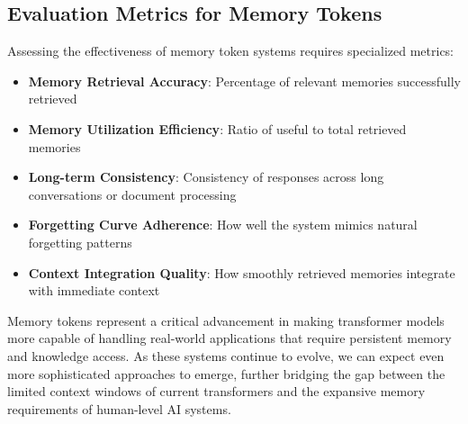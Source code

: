 \subsection{Evaluation Metrics for Memory Tokens}

Assessing the effectiveness of memory token systems requires specialized metrics:

\begin{itemize}
\item \textbf{Memory Retrieval Accuracy}: Percentage of relevant memories successfully retrieved
\item \textbf{Memory Utilization Efficiency}: Ratio of useful to total retrieved memories
\item \textbf{Long-term Consistency}: Consistency of responses across long conversations or document processing
\item \textbf{Forgetting Curve Adherence}: How well the system mimics natural forgetting patterns
\item \textbf{Context Integration Quality}: How smoothly retrieved memories integrate with immediate context
\end{itemize}

Memory tokens represent a critical advancement in making transformer models more capable of handling real-world applications that require persistent memory and knowledge access. As these systems continue to evolve, we can expect even more sophisticated approaches to emerge, further bridging the gap between the limited context windows of current transformers and the expansive memory requirements of human-level AI systems.